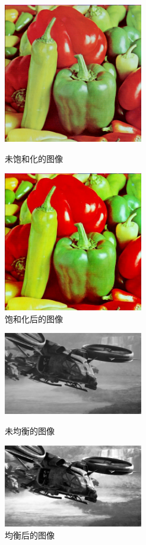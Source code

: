 \documentclass[a4paper,10pt]{article}
\theoremstyle{definition}
\theoremstyle{plain}
\begin{document}
\begin{figure}
\begin{minipage}[h]{0.5\linewidth}
\centering
\includegraphics[width=2.4in]{peppers.bmp}
\caption{未饱和化的图像}
\label{side:a}
\end{minipage}%
\begin{minipage}[h]{0.5\linewidth}
\centering
\includegraphics[width=2.4in]{pepper.jpg}
\caption{饱和化后的图像}
\label{side:b}
\end{minipage}
\end{figure}




\begin{figure}
\begin{minipage}[h]{0.5\linewidth}
\centering
\includegraphics[width=2.4in]{frame1.jpg}
\caption{未均衡的图像}
\label{fig:side:a}
\end{minipage}%
\begin{minipage}[h]{0.5\linewidth}
\centering
\includegraphics[width=2.4in]{frame1_equalized.jpg}
\caption{均衡后的图像}
\label{fig:side:b}
\end{minipage}
\end{figure}


\end{document}
